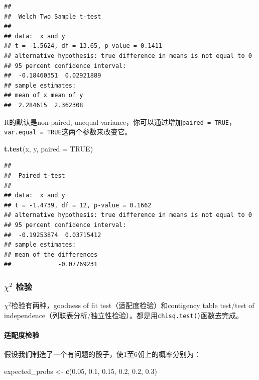 \documentclass[]{book}
\newenvironment{Shaded}{\begin{snugshade}}{\end{snugshade}}
\newcommand{\DataTypeTok}[1]{\textcolor[rgb]{0.13,0.29,0.53}{#1}}
\newcommand{\FloatTok}[1]{\textcolor[rgb]{0.00,0.00,0.81}{#1}}
\newcommand{\KeywordTok}[1]{\textcolor[rgb]{0.13,0.29,0.53}{\textbf{#1}}}
\newcommand{\NormalTok}[1]{#1}
\newcommand{\OtherTok}[1]{\textcolor[rgb]{0.56,0.35,0.01}{#1}}
\newcommand{\StringTok}[1]{\textcolor[rgb]{0.31,0.60,0.02}{#1}}
\let\oldparagraph\paragraph
\renewcommand{\paragraph}[1]{\oldparagraph{#1}\mbox{}}
\begin{document}
\begin{verbatim}
## 
##  Welch Two Sample t-test
## 
## data:  x and y
## t = -1.5624, df = 13.65, p-value = 0.1411
## alternative hypothesis: true difference in means is not equal to 0
## 95 percent confidence interval:
##  -0.18460351  0.02921889
## sample estimates:
## mean of x mean of y 
##  2.284615  2.362308
\end{verbatim}

R的默认是non-paired, unequal variance，你可以通过增加\texttt{paired\ =\ TRUE}，\texttt{var.equal\ =\ TRUE}这两个参数来改变它。

\begin{Shaded}
\begin{Highlighting}[]
\KeywordTok{t.test}\NormalTok{(x, y, }\DataTypeTok{paired =} \OtherTok{TRUE}\NormalTok{)}
\end{Highlighting}
\end{Shaded}

\begin{verbatim}
## 
##  Paired t-test
## 
## data:  x and y
## t = -1.4739, df = 12, p-value = 0.1662
## alternative hypothesis: true difference in means is not equal to 0
## 95 percent confidence interval:
##  -0.19253874  0.03715412
## sample estimates:
## mean of the differences 
##             -0.07769231
\end{verbatim}

\hypertarget{chisq-test}{%
\subsubsection{\texorpdfstring{\(\chi^2\) 检验}{\textbackslash{}chi\^{}2 检验}}\label{chisq-test}}

\(\chi^2\)检验有两种，goodness of fit test（适配度检验）和contigency table test/test of independence（列联表分析/独立性检验）。都是用\texttt{chisq.test()}函数去完成。

\hypertarget{chisq-gof}{%
\paragraph{适配度检验}\label{chisq-gof}}

假设我们制造了一个有问题的骰子，使1至6朝上的概率分别为：

\begin{Shaded}
\begin{Highlighting}[]
\NormalTok{expected_probs <-}\StringTok{ }\KeywordTok{c}\NormalTok{(}\FloatTok{0.05}\NormalTok{, }\FloatTok{0.1}\NormalTok{, }\FloatTok{0.15}\NormalTok{, }\FloatTok{0.2}\NormalTok{, }\FloatTok{0.2}\NormalTok{, }\FloatTok{0.3}\NormalTok{)}
\end{Highlighting}
\end{Shaded}
\end{document}
